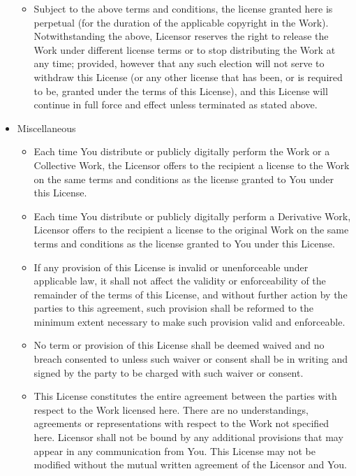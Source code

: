 \documentclass{article}
\begin{document}
\begin{itemize}
\begin{itemize}
\item Subject to the above terms and conditions, the license granted
here is perpetual (for the duration of the applicable copyright in the
Work).  Notwithstanding the above, Licensor reserves the right to
release the Work under different license terms or to stop distributing
the Work at any time; provided, however that any such election will
not serve to withdraw this License (or any other license that has
been, or is required to be, granted under the terms of this License),
and this License will continue in full force and effect unless
terminated as stated above.  \end{itemize} \item Miscellaneous
\begin{itemize} \item Each time You distribute or publicly digitally
perform the Work or a Collective Work, the Licensor offers to the
recipient a license to the Work on the same terms and conditions as
the license granted to You under this License.

\item Each time You distribute or publicly digitally perform a
Derivative Work, Licensor offers to the recipient a license to the
original Work on the same terms and conditions as the license granted
to You under this License.

\item If any provision of this License is invalid or unenforceable
under applicable law, it shall not affect the validity or
enforceability of the remainder of the terms of this License, and
without further action by the parties to this agreement, such
provision shall be reformed to the minimum extent necessary to make
such provision valid and enforceable.

\item No term or provision of this License shall be deemed waived and
no breach consented to unless such waiver or consent shall be in
writing and signed by the party to be charged with such waiver or
consent.

\item This License constitutes the entire agreement between the parties
with respect to the Work licensed here.  There are no understandings,
agreements or representations with respect to the Work not specified
here.  Licensor shall not be bound by any additional provisions that
may appear in any communication from You.  This License may not be
modified without the mutual written agreement of the Licensor and
You.\end{itemize} \end{itemize}
\end{document}
